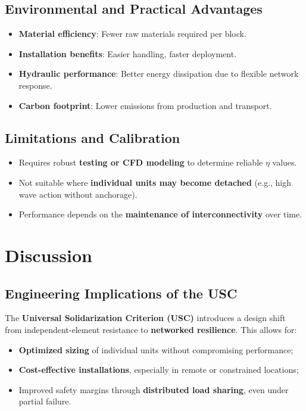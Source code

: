 \documentclass[Journal,letterpaper]{ascelike-new}
\begin{document}
\subsection{Environmental and Practical Advantages}

\begin{itemize}
\item \textbf{Material efficiency}: Fewer raw materials required per block.

\item  \textbf{Installation benefits}: Easier handling, faster deployment.

\item  \textbf{Hydraulic performance}: Better energy dissipation due to flexible network response.

\item  \textbf{Carbon footprint}: Lower emissions from production and transport.
\end{itemize}

\subsection{Limitations and Calibration}

\begin{itemize}
\item Requires robust \textbf{testing or CFD modeling} to determine reliable $\eta $ values.

\item  Not suitable where \textbf{individual units may become detached} (e.g., high wave action without anchorage).

\item  Performance depends on the \textbf{maintenance of interconnectivity} over time.
\end{itemize}


\section{Discussion}

\subsection{Engineering Implications of the USC}

The \textbf{Universal Solidarization Criterion (USC)} introduces a design shift from independent-element resistance to \textbf{networked resilience}. This allows for:

\begin{itemize}
\item  \textbf{Optimized sizing} of individual units without compromising performance;

\item  \textbf{Cost-effective installations}, especially in remote or constrained locations;

\item  Improved safety margins through \textbf{distributed load sharing}, even under partial failure.
\end{itemize}
\end{document}
